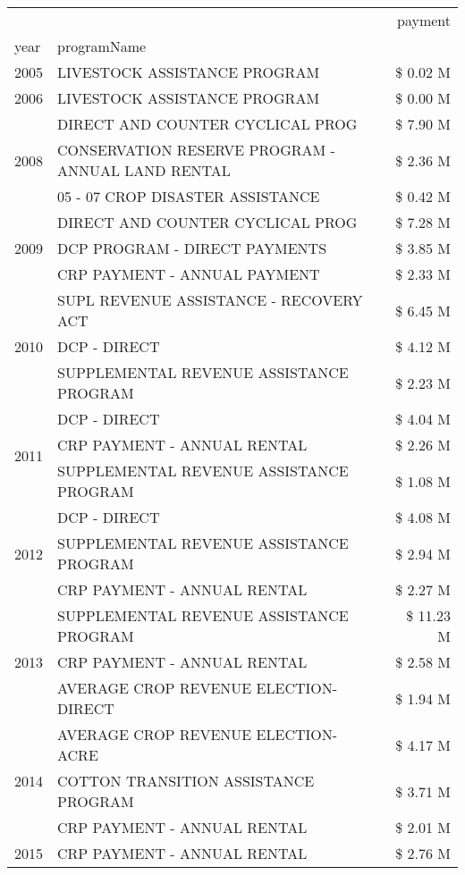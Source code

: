 \begin{tabular}{llr}
\toprule
 &  & payment \\
year & programName &  \\
\midrule
2005 & LIVESTOCK ASSISTANCE PROGRAM & \$ 0.02 M \\
\cline{1-3}
2006 & LIVESTOCK ASSISTANCE PROGRAM & \$ 0.00 M \\
\cline{1-3}
\multirow[t]{3}{*}{2008} & DIRECT AND COUNTER CYCLICAL PROG & \$ 7.90 M \\
 & CONSERVATION RESERVE PROGRAM - ANNUAL LAND RENTAL & \$ 2.36 M \\
 & 05 - 07 CROP DISASTER ASSISTANCE & \$ 0.42 M \\
\cline{1-3}
\multirow[t]{3}{*}{2009} & DIRECT AND COUNTER CYCLICAL PROG & \$ 7.28 M \\
 & DCP PROGRAM - DIRECT PAYMENTS & \$ 3.85 M \\
 & CRP PAYMENT - ANNUAL PAYMENT & \$ 2.33 M \\
\cline{1-3}
\multirow[t]{3}{*}{2010} & SUPL REVENUE ASSISTANCE - RECOVERY ACT & \$ 6.45 M \\
 & DCP - DIRECT & \$ 4.12 M \\
 & SUPPLEMENTAL REVENUE ASSISTANCE PROGRAM & \$ 2.23 M \\
\cline{1-3}
\multirow[t]{3}{*}{2011} & DCP - DIRECT & \$ 4.04 M \\
 & CRP PAYMENT - ANNUAL RENTAL & \$ 2.26 M \\
 & SUPPLEMENTAL REVENUE ASSISTANCE PROGRAM & \$ 1.08 M \\
\cline{1-3}
\multirow[t]{3}{*}{2012} & DCP - DIRECT & \$ 4.08 M \\
 & SUPPLEMENTAL REVENUE ASSISTANCE PROGRAM & \$ 2.94 M \\
 & CRP PAYMENT - ANNUAL RENTAL & \$ 2.27 M \\
\cline{1-3}
\multirow[t]{3}{*}{2013} & SUPPLEMENTAL REVENUE ASSISTANCE PROGRAM & \$ 11.23 M \\
 & CRP PAYMENT - ANNUAL RENTAL & \$ 2.58 M \\
 & AVERAGE CROP REVENUE ELECTION-DIRECT & \$ 1.94 M \\
\cline{1-3}
\multirow[t]{3}{*}{2014} & AVERAGE CROP REVENUE ELECTION-ACRE & \$ 4.17 M \\
 & COTTON TRANSITION ASSISTANCE PROGRAM & \$ 3.71 M \\
 & CRP PAYMENT - ANNUAL RENTAL & \$ 2.01 M \\
\cline{1-3}
\multirow[t]{3}{*}{2015} & CRP PAYMENT - ANNUAL RENTAL & \$ 2.76 M \\

\end{tabular}
